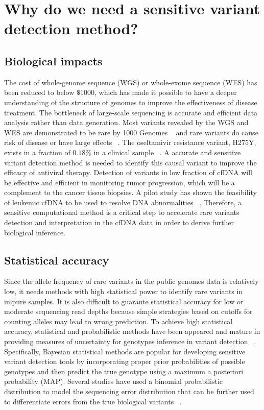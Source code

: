 \documentclass[11pt,reqno]{amsart}
\begin{document}
\section{Why do we need a sensitive variant detection method?}

\subsection{Biological impacts}

The cost of whole-genome sequence (WGS) or whole-exome sequence (WES) has been reduced to below $\$1000$, which has made it possible to have a deeper understanding of the structure of genomes to improve the effectiveness of disease treatment. 
The bottleneck of large-scale sequencing is accurate and efficient data analysis rather than data generation.
Most variants revealed by the WGS and WES are demonstrated to be rare by 1000 Genomes ~\citep{10002010map} and rare variants do cause risk of disease or have large effects ~\citep{kosmicki2016discovery}.
The oseltamivir resistance variant, H275Y, exists in a fraction of $0.18\%$ in a clinical sample ~\citep{Flaherty2012}.
A accurate and sensitive variant detection method is needed to identify this causal variant to improve the efficacy of antiviral therapy.
Detection of variants in low fraction of cfDNA will be effective and efficient in monitoring tumor progression, which will be a complement to the cancer tissue biopsies.
A pilot study has shown the feasibility of leukemic cfDNA to be used to resolve DNA abnormalities ~\citep{zhou2014pilot}.
Therefore, a sensitive computational method is a critical step to accelerate rare variants detection and interpretation in the cfDNA data in order to derive further biological inference.


\subsection{Statistical accuracy}

Since the allele frequency of rare variants in the public genomes data is relatively low, it needs methods with high statistical power to identify rare variants in impure samples. 
It is also difficult to guarante statistical accuracy for low or moderate sequencing read depths because simple strategies based on cutoffs for counting alleles may lead to wrong prediction.
To achieve high statistical accuracy, statistical and probabilistic methods have been appeared and mature in providing measures of uncertainty for genotypes inference in variant detection ~\citep{Nielsen2011}.  
Specifically, Bayesian statistical methods are popular for developing sensitive variant detection tools by incorporating proper prior probabilities of possible genotypes and then predict the true genotype using a maximum a posteriori probability (MAP).
Several studies have used a binomial probabilistic distribution to model the sequencing error distribution that can be further used to differentiate errors from the true biological variants ~\citep{Flaherty2012, Shiraishi2013, gerstung2012reliable, Christoforides2013}.
\end{document}
